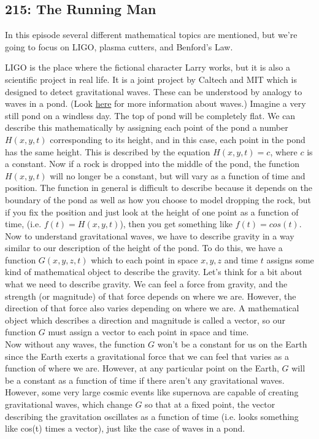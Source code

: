 \newpage
\subsection{215: The Running Man}\label{215}

In this episode several different mathematical topics are mentioned, but we're going to focus on LIGO, plasma cutters, and Benford's Law. \\


LIGO is the place where the fictional character Larry works, but it is also a scientific project in real life. It is a joint project by Caltech and MIT which is designed to detect gravitational waves. These can be understood by analogy to waves in a pond. (Look \hyperref[220]{here} for more information about waves.) Imagine a very still pond on a windless day. The top of pond will be completely flat. We can describe this mathematically by assigning each point of the pond a number $H(x,y,t)$ corresponding to its height, and in this case, each point in the pond has the same height. This is described by the equation $H(x,y,t)=c$, where $c$ is a constant. Now if a rock is dropped into the middle of the pond, the function $H(x,y,t)$ will no longer be a constant, but will vary as a function of time and position. The function in general is difficult to describe because it depends on the boundary of the pond as well as how you choose to model dropping the rock, but if you fix the position and just look at the height of one point as a function of time, (i.e. $f(t) = H(x,y,t)$), then you get something like $f(t) = cos(t)$. \\

Now to understand gravitational waves, we have to describe gravity in a way similar to our description of the height of the pond. To do this, we have a function $G(x,y,z,t)$ which to each point in space $x,y,z$ and time $t$ assigns some kind of mathematical object to describe the gravity. Let's think for a bit about what we need to describe gravity. We can feel a force from gravity, and the strength (or magnitude) of that force depends on where we are. However, the direction of that force also varies depending on where we are. A mathematical object which describes a direction and magnitude is called a vector, so our function $G$ must assign a vector to each point in space and time. \\

Now without any waves, the function $G$ won't be a constant for us on the Earth since the Earth exerts a gravitational force that we can feel that varies as a function of where we are. However, at any particular point on the Earth, $G$ will be a constant as a function of time if there aren't any gravitational waves. However, some very large cosmic events like supernova are capable of creating gravitational waves, which change $G$ so that at a fixed point, the vector describing the gravitation oscillates as a function of time (i.e. looks something like cos(t) times a vector), just like the case of waves in a pond. \\

